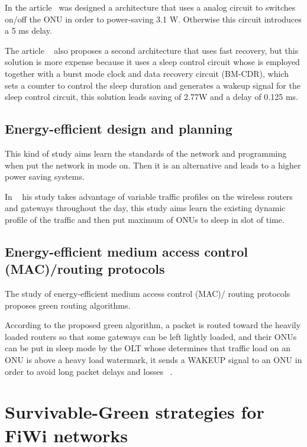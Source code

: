 \documentclass[conference,compsoc]{IEEEtran}
\begin{document}
In the article~\cite{sleepmode} was designed a architecture that uses a analog circuit to switches 
on/off the ONU in order to power-saving 3.1 W. Otherwise this circuit introduces a 5 ms delay.

The article ~\cite{sleepmode} also proposes a second architecture that uses fast recovery, but this 
solution is more expense because it uses a sleep control circuit whose is
employed together with a burst mode clock and data recovery circuit (BM-CDR), which sets a counter 
to control the sleep duration and generates a wakeup signal for the sleep control circuit, this 
solution leads saving of 2.77W and a delay of 0.125 ms.


\subsection{Energy-efficient design and planning}
 
 This kind of study aims learn the standards of the network and programming when put the network in 
 mode on. Then it is an alternative and leads to a higher power saving systems.
 
 In ~\cite{5424000} his study takes advantage of variable traffic profiles on the wireless 
routers and gateways throughout the day, this study aims learn the existing dynamic profile of the 
 traffic and then put maximum of ONUs to sleep in slot of time.
 
 
\subsection{Energy-efficient medium access control (MAC)/routing protocols }

 The study of energy-efficient medium access control (MAC)/ routing protocols proposes green 
routing algorithms.

According to the proposed green algorithm, a packet is
routed toward the heavily loaded routers so that some gateways
can be left lightly loaded, and their ONUs can be put in sleep
mode by the OLT whose determines that traffic load on
an ONU is above a heavy load watermark, it sends a WAKEUP
signal to an ONU in order to avoid long packet delays and losses ~\cite{fiwienergyeficient}.
  
\section{Survivable-Green strategies for FiWi networks}%
\label{section:sv}
\end{document}
